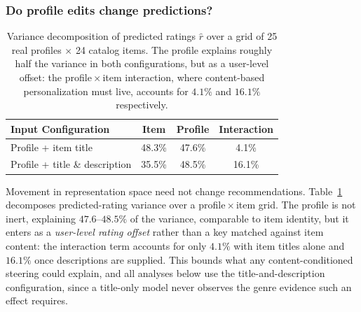 \subsubsection{Do profile edits change predictions?}
\label{sec:repr_to_behavior}

\begin{table}[t]
    \centering
    \small
    \caption{Variance decomposition of predicted ratings $\hat{r}$ over a grid of 25 real profiles $\times$ 24 catalog items. The profile explains roughly half the variance in both configurations, but as a user-level offset: the profile\,$\times$\,item interaction, where content-based personalization must live, accounts for $4.1\%$ and $16.1\%$ respectively.}
    \label{tab:variance_decomposition}
    \begin{tabular}{lccc}
    \toprule
    \textbf{Input Configuration} & \textbf{Item} & \textbf{Profile} & \textbf{Interaction} \\
    \midrule
    Profile + item title              & 48.3\% & 47.6\% & \phantom{0}4.1\% \\
    Profile + title \& description    & 35.5\% & 48.5\% & 16.1\% \\
    \bottomrule
    \end{tabular}
\end{table}

Movement in representation space need not change recommendations. Table~\ref{tab:variance_decomposition} decomposes predicted-rating variance over a profile\,$\times$\,item grid. The profile is not inert, explaining $47.6$--$48.5\%$ of the variance, comparable to item identity, but it enters as a \emph{user-level rating offset} rather than a key matched against item content: the interaction term accounts for only $4.1\%$ with item titles alone and $16.1\%$ once descriptions are supplied. This bounds what any content-conditioned steering could explain, and all analyses below use the title-and-description configuration, since a title-only model never observes the genre evidence such an effect requires.

